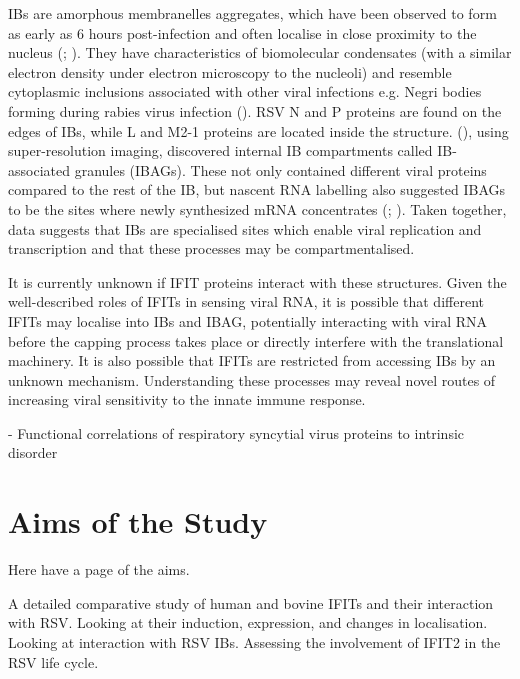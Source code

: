 IBs are amorphous membranelles aggregates, which have been observed to form as early as 6 hours post-infection and often localise in close proximity to the nucleus (\cite{Bachi1973MorphogenesisVirus}; \cite{Jobe2020RespiratorySignaling}). They have characteristics of biomolecular condensates (with a similar electron density under electron microscopy to the nucleoli) and resemble cytoplasmic inclusions associated with other viral infections e.g. Negri bodies forming during rabies virus infection (\cite{Nikolic2017NegriOrganelles}). RSV N and P proteins are found on the edges of IBs, while L and M2-1 proteins are located inside the structure. (\cite{Rincheval2017FunctionalVirus}), using super-resolution imaging, discovered internal IB compartments called IB-associated granules (IBAGs). These not only contained different viral proteins compared to the rest of the IB, but nascent RNA labelling also suggested IBAGs to be the sites where newly synthesized mRNA concentrates (\cite{Jobe2020RespiratorySignaling}; \cite{Richard2018RSVTranscription}). Taken together, data suggests that IBs are specialised sites which enable viral replication and transcription and that these processes may be compartmentalised.

It is currently unknown if IFIT proteins interact with these structures. Given the well-described roles of IFITs in sensing viral RNA, it is possible that different IFITs may localise into IBs and IBAG, potentially interacting with viral RNA before the capping process takes place or directly interfere with the translational machinery. It is also possible that IFITs are restricted from accessing IBs by an unknown mechanism. Understanding these processes may reveal novel routes of increasing viral sensitivity to the innate immune response.



\cite{Whelan2016FunctionalDisorder} - Functional correlations of respiratory syncytial virus proteins to intrinsic disorder





\section{Aims of the Study} \label{sec:Aims}
Here have a page of the aims.

A detailed comparative study of human and bovine IFITs and their interaction with RSV. Looking at their induction, expression, and changes in localisation. Looking at interaction with RSV IBs. Assessing the involvement of IFIT2 in the RSV life cycle.


